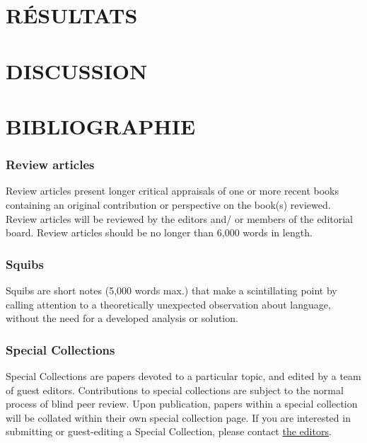 \documentclass[]{glossa}
\begin{document}
\hypertarget{ruxe9sultats}{%
\section{RÉSULTATS}\label{ruxe9sultats}}

\hypertarget{discussion}{%
\section{DISCUSSION}\label{discussion}}

\hypertarget{bibliographie}{%
\section{BIBLIOGRAPHIE}\label{bibliographie}}

\hypertarget{review-articles}{%
\subsubsection{Review articles}\label{review-articles}}

Review articles present longer critical appraisals of one or more recent
books containing an original contribution or perspective on the book(s)
reviewed. Review articles will be reviewed by the editors and/ or
members of the editorial board. Review articles should be no longer than
6,000 words in length.

\hypertarget{squibs}{%
\subsubsection{Squibs}\label{squibs}}

Squibs are short notes (5,000 words max.) that make a scintillating
point by calling attention to a theoretically unexpected observation
about language, without the need for a developed analysis or solution.

\hypertarget{special-collections}{%
\subsubsection{Special Collections}\label{special-collections}}

Special Collections are papers devoted to a particular topic, and edited
by a team of guest editors. Contributions to special collections are
subject to the normal process of blind peer review. Upon publication,
papers within a special collection will be collated within their own
special collection page. If you are interested in submitting or
guest-editing a Special Collection, please contact
\href{https://www.glossa-journal.org/about/editorialteam/}{the editors}.
\end{document}
